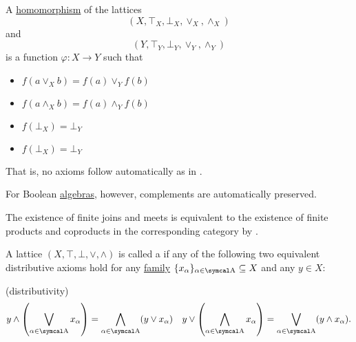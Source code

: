 \begin{proposition}\label{thm:lattice_homomorphism}
  A \hyperref[def:first_order_homomorphism]{homomorphism} of the lattices
  \begin{equation*}
    (X, \top_X, \bot_X, \vee_X, \wedge_X)
  \end{equation*}
  and
  \begin{equation*}
    (Y, \top_Y, \bot_Y, \vee_Y, \wedge_Y)
  \end{equation*}
  is a function \( \varphi: X \to Y \) such that
  \begin{itemize}
    \item \( f(a \vee_X b) = f(a) \vee_Y f(b) \)
    \item \( f(a \wedge_X b) = f(a) \wedge_Y f(b) \)
    \item \( f(\bot_X) = \bot_Y \)
    \item \( f(\bot_X) = \bot_Y \)
  \end{itemize}

  That is, no axioms follow automatically as in .

  For Boolean \hyperref[def:boolean_algebra]{algebras}, however, complements are automatically preserved.
\end{proposition}

\begin{remark}\label{def:lattice_categorical_product}
  The existence of finite joins and meets is equivalent to the existence of finite products and coproducts in the corresponding category by .
\end{remark}

\begin{definition}\label{def:distributive_lattice}\cite{nLab:distributive_lattice}
  A lattice \( (X, \top, \bot, \vee, \wedge) \) is called a  if any of the following two equivalent distributive axioms hold for any \hyperref[def:indexed_family]{family} \( \{ x_\al \}_{\al \in \CA} \subseteq X \) and any \( y \in X \):
  \begin{description}
    (distributivity)
    \begin{align*}
      y \wedge \left( \bigvee_{\al \in \CA} x_\al \right) = \bigwedge_{\al \in \CA} (y \vee x_\al)
      &&
      y \vee \left( \bigwedge_{\al \in \CA} x_\al \right) = \bigvee_{\al \in \CA} (y \wedge x_\al).
    \end{align*}
  \end{description}
\end{definition}

